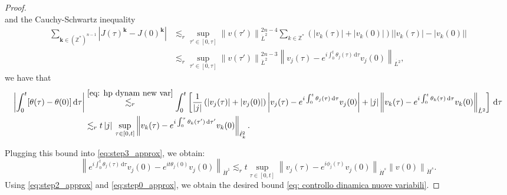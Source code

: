 \documentclass[a4paper,10pt,reqno]{article}
\theoremstyle{definition}
\theoremstyle{plain}
\theoremstyle{plain}
\theoremstyle{definition}
\theoremstyle{plain}
\theoremstyle{plain}
\theoremstyle{plain}
\theoremstyle{definition}
\theoremstyle{definition}
\newcommand{\norm}[1]{\left\lVert #1 \right\rVert}
\def \Z{\mathbb Z}
\def \k{\bm{k}}
\begin{document}
\begin{proof}
\[\]
and the Cauchy-Schwartz inequality
\begin{equation} \label{eq: stima utile in prob}
\begin{split}
\sum_{\k \in (\Z^*)^{n-1}} \left \lvert J(\tau)^{\k} - J(0)^{\k} \right \rvert &\lesssim_r \sup_{\tau' \in [0,\tau]} \norm{v(\tau')}_{\dot{L}^2}^{2n-4} \sum_{k \in \Z^*} \left ( |v_{k}(\tau)|+|v_{k}(0)| \right ) \big | |v_{k}(\tau)|-|v_{k}(0)| \big | \\
&\lesssim_r \sup_{\tau' \in [0,\tau]} \norm{v(\tau')}_{\dot{L}^2}^{2n-3} \norm{v_j(\tau) - e^{i \int_0^t \theta_j(\tau) \, \mathrm{d}\tau} v_j(0)}_{\dot{L^2}},
\end{split}
\end{equation}
we have that
\[
\begin{split}
 \left \lvert  \int_0^t [\theta (\tau)-\theta (0)]\, \mathrm{d}\tau \right\rvert  & \stackrel{\eqref{eq: hp dynam new var}}{\lesssim_r} \int_0^t \left [ \frac{1}{|j|} \left ( |v_j(\tau)|+|v_j(0)| \right ) \left \lvert v_j(\tau) - e^{i \int_0^t \theta_j(\tau) \, \mathrm{d}\tau} v_j(0) \right \rvert + |j| \norm{v_k(\tau) - e^{i \int_0^t \theta_k(\tau) \, \mathrm{d}\tau} v_k(0)}_{\dot{L}^2} \right ] \, \mathrm{d} \tau\\
& \lesssim_r 
t \, |j|\,\sup_{\tau\in [0,t]} \norm{v_k(\tau) - e^{i \int_0^{\tau} \theta_k(\tau') \, \mathrm{d}\tau'} v_k(0)}_{\dot{\ell}^2_k}.
\end{split}
\]

Plugging this bound into \eqref{eq:step3_approx}, we obtain:
\[
\norm{e^{i \int_0^t \theta_j(\tau) \, \mathrm{d} \tau}v_j(0) - e^{i t \theta_j(0)}v_j(0)}_{\dot{H}^1}  \lesssim_r t \!\! \sup_{\tau \in [0,t]} \norm{v_j(\tau) - e^{i \phi_j(\tau)} v_j(0)}_{\dot{H}^s} \!\! \norm{v(0)}_{\dot{H}^s}.
\]
Using \eqref{eq:step2_approx} and \eqref{eq:step0_approx}, we obtain the desired bound \eqref{eq: controllo dinamica nuove variabili}.
\end{proof}
\end{document}
